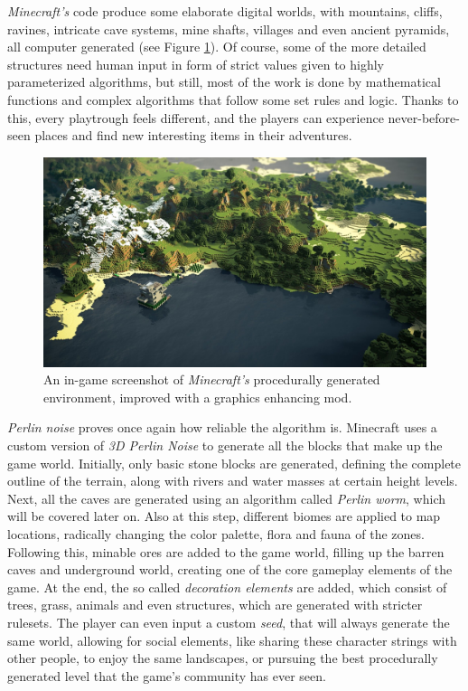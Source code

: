 \textit{Minecraft's} code produce some elaborate digital worlds, with mountains, cliffs, ravines, intricate cave systems, mine shafts, villages and even ancient pyramids, all computer generated (see Figure \ref{fig:minecraft}). Of course, some of the more detailed structures need human input in form of strict values given to highly parameterized algorithms, but still, most of the work is done by mathematical functions and complex algorithms that follow some set rules and logic. Thanks to this, every playtrough feels different, and the players can experience never-before-seen places and find new interesting items in their adventures.

\begin{figure}[htp]
    \centering
    \includegraphics[width = 16cm]{figures/minecraft.jpg}
    \caption{An in-game screenshot of \textit{Minecraft's} procedurally generated environment, improved with a graphics enhancing mod.}
    \label{fig:minecraft}
\end{figure}

\textit{Perlin noise} proves once again how reliable the algorithm is. Minecraft uses a custom version of \textit{3D Perlin Noise} to generate all the blocks that make up the game world. Initially, only basic stone blocks are generated, defining the complete outline of the terrain, along with rivers and water masses at certain height levels. Next, all the caves are generated using an algorithm called \textit{Perlin worm}, which will be covered later on. Also at this step, different biomes are applied to map locations, radically changing the color palette, flora and fauna of the zones. Following this, minable ores are added to the game world, filling up the barren caves and underground world, creating one of the core gameplay elements of the game. At the end, the so called \textit{decoration elements} are added, which consist of trees, grass, animals and even structures, which are generated with stricter rulesets. The player can even input a custom \textit{seed}, that will always generate the same world, allowing for social elements, like sharing these character strings with other people, to enjoy the same landscapes, or pursuing the best procedurally generated level that the game's community has ever seen. \\

